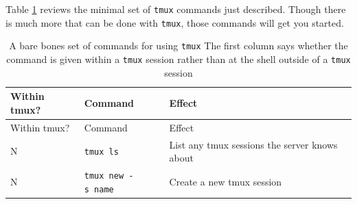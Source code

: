 \documentclass[]{krantz}
\begin{document}
Table \ref{tab:minimal-tmux} reviews the minimal set of
\texttt{tmux} commands just described. Though there is much more that
can be done with \texttt{tmux}, those commands will get you started.

\begin{longtable}[]{@{}lll@{}}
\caption{\label{tab:minimal-tmux} A bare bones set of commands for using \texttt{tmux} The first column says whether the command is given within a \texttt{tmux} session rather than at the shell outside of a \texttt{tmux} session}\tabularnewline
\toprule
\begin{minipage}[b]{0.18\columnwidth}\raggedright
Within tmux?\strut
\end{minipage} & \begin{minipage}[b]{0.36\columnwidth}\raggedright
Command\strut
\end{minipage} & \begin{minipage}[b]{0.38\columnwidth}\raggedright
Effect\strut
\end{minipage}\tabularnewline
\midrule
\endfirsthead
\toprule
\begin{minipage}[b]{0.18\columnwidth}\raggedright
Within tmux?\strut
\end{minipage} & \begin{minipage}[b]{0.36\columnwidth}\raggedright
Command\strut
\end{minipage} & \begin{minipage}[b]{0.38\columnwidth}\raggedright
Effect\strut
\end{minipage}\tabularnewline
\midrule
\endhead
\begin{minipage}[t]{0.18\columnwidth}\raggedright
N\strut
\end{minipage} & \begin{minipage}[t]{0.36\columnwidth}\raggedright
\texttt{tmux\ ls}\strut
\end{minipage} & \begin{minipage}[t]{0.38\columnwidth}\raggedright
List any tmux sessions the
server knows about\strut
\end{minipage}\tabularnewline
\begin{minipage}[t]{0.18\columnwidth}\raggedright
N\strut
\end{minipage} & \begin{minipage}[t]{0.36\columnwidth}\raggedright
\texttt{tmux\ new\ -s\ name}\strut
\end{minipage} & \begin{minipage}[t]{0.38\columnwidth}\raggedright
Create a new tmux session

\end{minipage}
\end{longtable}
\end{document}
